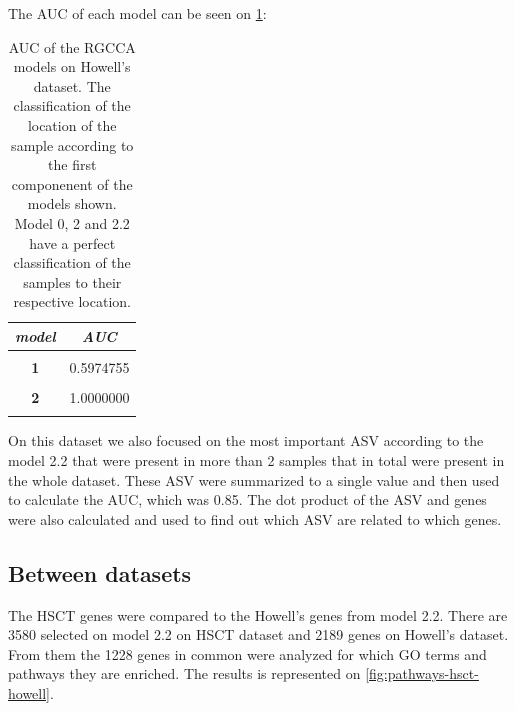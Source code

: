 \documentclass[
  12pt,
  a4paper,
  twoside,
  openright]{book}
\begin{document}
The AUC of each model can be seen on \ref{tab:howell-auc}:

\begin{table}[H]

\caption[AUC of the RGCCA models on Howell's dataset]{\label{tab:howell-auc}AUC of the RGCCA models on Howell's dataset. The classification of the location of the sample according to the first componenent of the models shown. Model 0, 2 and 2.2 have a perfect classification of the samples to their respective location.}
\centering
\begin{tabular}[t]{|>{}c|>{}c|}
\hline
\em{\textbf{model}} & \em{\textbf{AUC}}\\
\hline
\textbf{\cellcolor{gray!6}{0}} & \cellcolor{gray!6}{0.6255259}\\
\hline
\textbf{1} & 0.5974755\\
\hline
\textbf{\cellcolor{gray!6}{1.2}} & \cellcolor{gray!6}{1.0000000}\\
\hline
\textbf{2} & 1.0000000\\
\hline
\textbf{\cellcolor{gray!6}{2.2}} & \cellcolor{gray!6}{1.0000000}\\
\hline
\end{tabular}
\end{table}

On this dataset we also focused on the most important ASV according to the model 2.2 that were present in more than 2 samples that in total were present in the whole dataset.
These ASV were summarized to a single value and then used to calculate the AUC, which was 0.85.
The dot product of the ASV and genes were also calculated and used to find out which ASV are related to which genes.

\hypertarget{between-datasets}{%
\subsection{Between datasets}\label{between-datasets}}

The HSCT genes were compared to the Howell's genes from model 2.2.
There are 3580 selected on model 2.2 on HSCT dataset and 2189 genes on Howell's dataset.
From them the 1228 genes in common were analyzed for which GO terms and pathways they are enriched.
The results is represented on \ref{fig:pathways-hsct-howell}.
\end{document}
